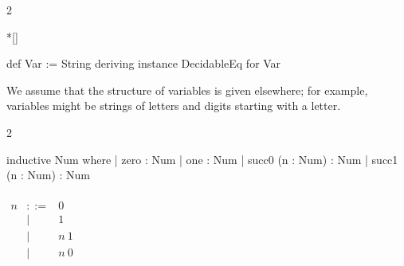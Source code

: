 \begin{paracol}{2}

    \switchcolumn[1]*[]
    \begin{leftcolumn}
        \begin{Lean_Code}
def Var := String
deriving instance
  DecidableEq for Var
        \end{Lean_Code}
    \end{leftcolumn}
    \begin{rightcolumn}\noindent
We assume that the structure of variables is given elsewhere;
for example, variables might be strings
of letters and digits starting with a letter.
    \end{rightcolumn}
\end{paracol}

\begin{paracol}{2}
\begin{leftcolumn}
    \begin{Lean_Code}
inductive Num where
  | zero : Num
  | one  : Num
  | succ0 (n : Num) : Num
  | succ1 (n : Num) : Num
    \end{Lean_Code}
\end{leftcolumn}
\begin{rightcolumn}
    \(\displaystyle
\begin{array}{lcl}
    \\[0.3em]
    n &::=& 0 \\ 
        &\mid& 1 \\ 
        &\mid& n\ 1 \\ 
        &\mid& n\ 0
\end{array}
    \)
\end{rightcolumn}
\end{paracol}
\vspace{1em}

